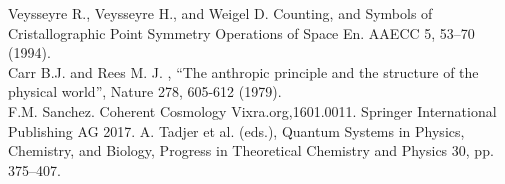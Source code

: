 \documentclass[a4paper,9pt]{article}
\begin{document}
\begin{thebibliography}{99}
 Veysseyre R., Veysseyre H., and Weigel D. Counting, and Symbols of Cristallographic Point Symmetry Operations of Space En. AAECC 5, 53--70 (1994).\\
 Carr B.J. and Rees M. J. , “The anthropic principle and the structure of the physical world”, Nature 278, 605-612 (1979).\\
 F.M. Sanchez. Coherent Cosmology Vixra.org,1601.0011. Springer International Publishing AG 2017. A. Tadjer et al. (eds.), Quantum Systems in Physics, Chemistry, and Biology, Progress in Theoretical Chemistry and Physics 30, pp. 375--407. \\ 
\end{thebibliography}







\end{document}
